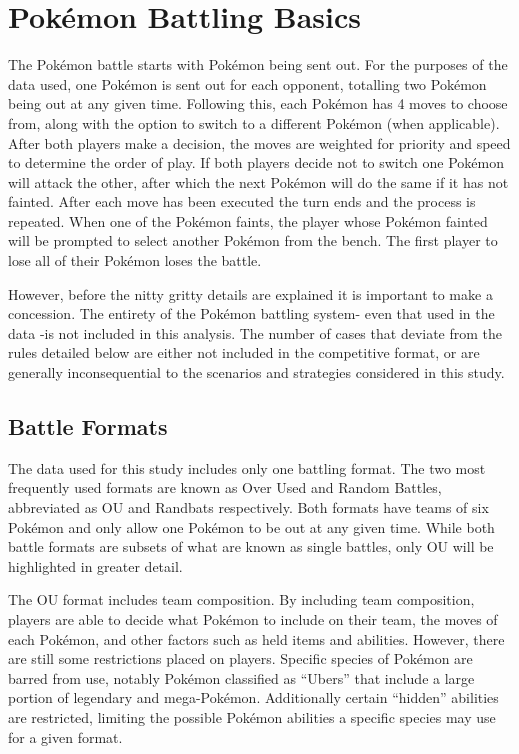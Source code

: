 \documentclass[12pt,twoside]{reedthesis}
\begin{document}
  \section{Pokémon Battling Basics}\label{pokemon-battling-basics}
  
  The Pokémon battle starts with Pokémon being sent out. For the purposes
  of the data used, one Pokémon is sent out for each opponent, totalling
  two Pokémon being out at any given time. Following this, each Pokémon
  has 4 moves to choose from, along with the option to switch to a
  different Pokémon (when applicable). After both players make a decision,
  the moves are weighted for priority and speed to determine the order of
  play. If both players decide not to switch one Pokémon will attack the
  other, after which the next Pokémon will do the same if it has not
  fainted. After each move has been executed the turn ends and the process
  is repeated. When one of the Pokémon faints, the player whose Pokémon
  fainted will be prompted to select another Pokémon from the bench. The
  first player to lose all of their Pokémon loses the battle.
  
  However, before the nitty gritty details are explained it is important
  to make a concession. The entirety of the Pokémon battling system- even
  that used in the data -is not included in this analysis. The number of
  cases that deviate from the rules detailed below are either not included
  in the competitive format, or are generally inconsequential to the
  scenarios and strategies considered in this study.
  
  \subsection{Battle Formats}\label{battle-formats}
  
  The data used for this study includes only one battling format. The two
  most frequently used formats are known as Over Used and Random Battles,
  abbreviated as OU and Randbats respectively. Both formats have teams of
  six Pokémon and only allow one Pokémon to be out at any given time.
  While both battle formats are subsets of what are known as single
  battles, only OU will be highlighted in greater detail.
  
  The OU format includes team composition. By including team composition,
  players are able to decide what Pokémon to include on their team, the
  moves of each Pokémon, and other factors such as held items and
  abilities. However, there are still some restrictions placed on players.
  Specific species of Pokémon are barred from use, notably Pokémon
  classified as ``Ubers'' that include a large portion of legendary and
  mega-Pokémon. Additionally certain ``hidden'' abilities are restricted,
  limiting the possible Pokémon abilities a specific species may use for a
  given format.
  
\end{document}
